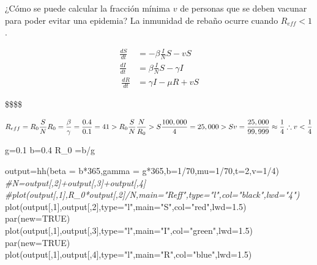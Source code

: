\documentclass[
]{article}
\newenvironment{Shaded}{\begin{snugshade}}{\end{snugshade}}
\newcommand{\AttributeTok}[1]{\textcolor[rgb]{0.77,0.63,0.00}{#1}}
\newcommand{\CommentTok}[1]{\textcolor[rgb]{0.56,0.35,0.01}{\textit{#1}}}
\newcommand{\ConstantTok}[1]{\textcolor[rgb]{0.00,0.00,0.00}{#1}}
\newcommand{\DecValTok}[1]{\textcolor[rgb]{0.00,0.00,0.81}{#1}}
\newcommand{\FloatTok}[1]{\textcolor[rgb]{0.00,0.00,0.81}{#1}}
\newcommand{\FunctionTok}[1]{\textcolor[rgb]{0.00,0.00,0.00}{#1}}
\newcommand{\NormalTok}[1]{#1}
\newcommand{\OtherTok}[1]{\textcolor[rgb]{0.56,0.35,0.01}{#1}}
\newcommand{\SpecialCharTok}[1]{\textcolor[rgb]{0.00,0.00,0.00}{#1}}
\newcommand{\StringTok}[1]{\textcolor[rgb]{0.31,0.60,0.02}{#1}}
\begin{document}
¿Cómo se puede calcular la fracción mínima \(v\) de personas que se
deben vacunar para poder evitar una epidemia? La inmunidad de rebaño
ocurre cuando \(R_{eff}< 1\).

\[
\begin{aligned}
\frac{dS}{dt}&= -\beta \frac{I}{N} S-vS\\
\frac{dI}{dt}&= \beta\frac{I}{N}S-\gamma I\\\
\frac{dR}{dt}&= \gamma I-\mu R+vS
\end{aligned}
\]

\$\$\$\$

\[
\\
R_{eff}=R_0\frac{S}{N}
\\
R_0=\frac{\beta}{\gamma}=\frac{0.4}{0.1}=4
\\
1>R_0\frac{S}{N}
\\
\frac{N}{R_0}>S
\\
\frac{100,000}{4}=25,000>S
\\
v=\frac{25,000}{99,999}\approx\frac{1}{4} \therefore v<\frac{1}{4}
\]

\begin{Shaded}
\begin{Highlighting}[]
\NormalTok{g}\OtherTok{=}\FloatTok{0.1}
\NormalTok{b}\OtherTok{=}\FloatTok{0.4}
\NormalTok{R\_0 }\OtherTok{=}\NormalTok{b}\SpecialCharTok{/}\NormalTok{g}

\NormalTok{output}\OtherTok{=}\FunctionTok{hh}\NormalTok{(}\AttributeTok{beta =}\NormalTok{ b}\SpecialCharTok{*}\DecValTok{365}\NormalTok{,}\AttributeTok{gamma =}\NormalTok{ g}\SpecialCharTok{*}\DecValTok{365}\NormalTok{,}\AttributeTok{b=}\DecValTok{1}\SpecialCharTok{/}\DecValTok{70}\NormalTok{,}\AttributeTok{mu=}\DecValTok{1}\SpecialCharTok{/}\DecValTok{70}\NormalTok{,}\AttributeTok{t=}\DecValTok{2}\NormalTok{,}\AttributeTok{v=}\DecValTok{1}\SpecialCharTok{/}\DecValTok{4}\NormalTok{)}
\CommentTok{\#N=output[,2]+output[,3]+output[,4]}
\CommentTok{\#plot(output[,1],R\_0*output[,2]/N,main="Reff",type="l",col="black",lwd="4")}
\FunctionTok{plot}\NormalTok{(output[,}\DecValTok{1}\NormalTok{],output[,}\DecValTok{2}\NormalTok{],}\AttributeTok{type=}\StringTok{"l"}\NormalTok{,}\AttributeTok{main=}\StringTok{"S"}\NormalTok{,}\AttributeTok{col=}\StringTok{"red"}\NormalTok{,}\AttributeTok{lwd=}\FloatTok{1.5}\NormalTok{)}
\FunctionTok{par}\NormalTok{(}\AttributeTok{new=}\ConstantTok{TRUE}\NormalTok{)}
\FunctionTok{plot}\NormalTok{(output[,}\DecValTok{1}\NormalTok{],output[,}\DecValTok{3}\NormalTok{],}\AttributeTok{type=}\StringTok{"l"}\NormalTok{,}\AttributeTok{main=}\StringTok{"I"}\NormalTok{,}\AttributeTok{col=}\StringTok{"green"}\NormalTok{,}\AttributeTok{lwd=}\FloatTok{1.5}\NormalTok{)}
\FunctionTok{par}\NormalTok{(}\AttributeTok{new=}\ConstantTok{TRUE}\NormalTok{)}
\FunctionTok{plot}\NormalTok{(output[,}\DecValTok{1}\NormalTok{],output[,}\DecValTok{4}\NormalTok{],}\AttributeTok{type=}\StringTok{"l"}\NormalTok{,}\AttributeTok{main=}\StringTok{"R"}\NormalTok{,}\AttributeTok{col=}\StringTok{"blue"}\NormalTok{,}\AttributeTok{lwd=}\FloatTok{1.5}\NormalTok{)}
\end{Highlighting}
\end{Shaded}
\end{document}
